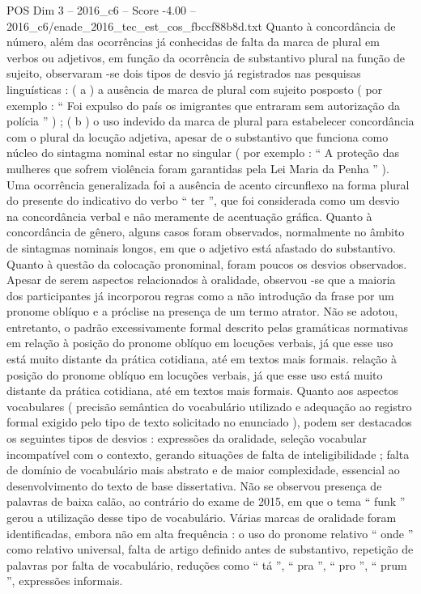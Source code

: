 \begin{textsample}{POS Dim 3 – 2016\_c6 – Score -4.00 – 2016\_c6/enade\_2016\_tec\_est\_cos\_fbccf88b8d.txt}
Quanto à concordância de número, além das ocorrências já conhecidas de falta da marca de plural em verbos ou adjetivos, em função da ocorrência de substantivo plural na função de sujeito, observaram -se dois tipos de desvio já registrados nas pesquisas linguísticas : ( a ) a ausência de marca de plural com sujeito posposto ( por exemplo : “ Foi expulso do país os imigrantes que entraram sem autorização da polícia ” ) ; ( b ) o uso indevido da marca de plural para estabelecer concordância com o plural da locução adjetiva, apesar de o substantivo que funciona como núcleo do sintagma nominal estar no singular ( por exemplo : “ A proteção das mulheres que sofrem violência foram garantidas pela Lei Maria da Penha ” ).
Uma ocorrência generalizada foi a ausência de acento circunflexo na forma plural do presente do indicativo do verbo “ ter ”, que foi considerada como um desvio na concordância verbal e não meramente de acentuação gráfica.
Quanto à concordância de gênero, alguns casos foram observados, normalmente no âmbito de sintagmas nominais longos, em que o adjetivo está afastado do substantivo.
Quanto à questão da colocação pronominal, foram poucos os desvios observados.
Apesar de serem aspectos relacionados à oralidade, observou -se que a maioria dos participantes já incorporou regras como a não introdução da frase por um pronome oblíquo e a próclise na presença de um termo atrator.
Não se adotou, entretanto, o padrão excessivamente formal descrito pelas gramáticas normativas em relação à posição do pronome oblíquo em locuções verbais, já que esse uso está muito distante da prática cotidiana, até em textos mais formais. relação à posição do pronome oblíquo em locuções verbais, já que esse uso está muito distante da prática cotidiana, até em textos mais formais.
Quanto aos aspectos vocabulares ( precisão semântica do vocabulário utilizado e adequação ao registro formal exigido pelo tipo de texto solicitado no enunciado ), podem ser destacados os seguintes tipos de desvios : expressões da oralidade, seleção vocabular incompatível com o contexto, gerando situações de falta de inteligibilidade ; falta de domínio de vocabulário mais abstrato e de maior complexidade, essencial ao desenvolvimento do texto de base dissertativa.
Não se observou presença de palavras de baixa calão, ao contrário do exame de 2015, em que o tema “ funk ” gerou a utilização desse tipo de vocabulário.
Várias marcas de oralidade foram identificadas, embora não em alta frequência : o uso do pronome relativo “ onde ” como relativo universal, falta de artigo definido antes de substantivo, repetição de palavras por falta de vocabulário, reduções como “ tá ”, “ pra ”, “ pro ”, “ prum ”, expressões informais.

\end{textsample}
